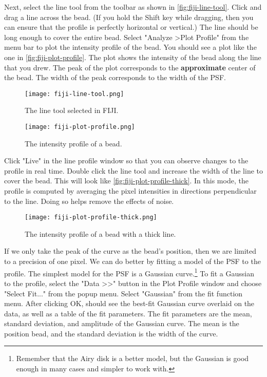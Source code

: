 \documentclass[10pt,a4paper,oneside]{book}
\begin{document}
Next, select the line tool from the toolbar as shown in \autoref{fig:fiji-line-tool}. Click and drag a line across the bead. (If you hold the Shift key while dragging, then you can ensure that the profile is perfectly horizontal or vertical.) The line should be long enough to cover the entire bead. Select "Analyze \textgreater Plot Profile" from the menu bar to plot the intensity profile of the bead. You should see a plot like the one in \autoref{fig:fiji-plot-profile}. The plot shows the intensity of the bead along the line that you drew. The peak of the plot corresponds to the \textbf{approximate} center of the bead. The width of the peak corresponds to the width of the PSF.

\begin{figure}[ht]
    \centering
    \texttt{[image: fiji-line-tool.png]}
    \caption{The line tool selected in FIJI.}
    \label{fig:fiji-line-tool}
\end{figure}

\begin{figure}[ht]
    \centering
    \texttt{[image: fiji-plot-profile.png]}
    \caption{The intensity profile of a bead.}
    \label{fig:fiji-plot-profile}
\end{figure}

Click "Live" in the line profile window so that you can observe changes to the profile in real time. Double click the line tool and increase the width of the line to cover the bead. This will look like \autoref{fig:fiji-plot-profile-thick}. In this mode, the profile is computed by averaging the pixel intensities in directions perpendicular to the line. Doing so helps remove the effects of noise.

\begin{figure}[ht]
    \centering
    \texttt{[image: fiji-plot-profile-thick.png]}
    \caption{The intensity profile of a bead with a thick line.}
    \label{fig:fiji-plot-profile-thick}
\end{figure}

If we only take the peak of the curve as the bead's position, then we are limited to a precision of one pixel. We can do better by fitting a model of the PSF to the profile. The simplest model for the PSF is a Gaussian curve.\footnote{Remember that the Airy disk is a better model, but the Gaussian is good enough in many cases and simpler to work with.} To fit a Gaussian to the profile, select the "Data \textgreater \textgreater" button in the Plot Profile window and choose "Select Fit..." from the popup menu. Select "Gaussian" from the fit function menu. After clicking OK, should see the best-fit Gaussian curve overlaid on the data, as well as a table of the fit parameters. The fit parameters are the mean, standard deviation, and amplitude of the Gaussian curve. The mean is the position bead, and the standard deviation is the width of the curve.
\end{document}
